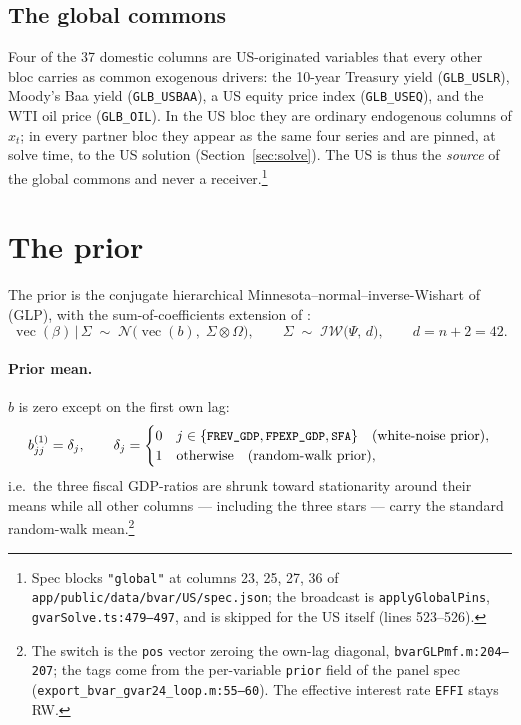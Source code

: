 \documentclass[11pt]{article}
\newcommand{\code}[1]{\texttt{\small #1}}
\begin{document}
\subsection{The global commons}\label{sec:globals}

Four of the 37 domestic columns are US-originated variables that every other bloc carries as
common exogenous drivers: the 10-year Treasury yield (\code{GLB\_USLR}), Moody's Baa yield
(\code{GLB\_USBAA}), a US equity price index (\code{GLB\_USEQ}), and the WTI oil price
(\code{GLB\_OIL}). In the US bloc they are ordinary endogenous columns of $x_t$; in every partner
bloc they appear as the same four series and are pinned, at solve time, to the US solution
(Section~\ref{sec:solve}). The US is thus the \emph{source} of the global commons and never a
receiver.\footnote{Spec blocks \code{"global"} at columns 23, 25, 27, 36 of
\code{app/public/data/bvar/US/spec.json}; the broadcast is \code{applyGlobalPins},
\code{gvarSolve.ts:479--497}, and is skipped for the US itself (lines 523--526).}

\section{The prior}\label{sec:prior}

The prior is the conjugate hierarchical Minnesota--normal--inverse-Wishart of
\citet{Giannone2015} (GLP), with the sum-of-coefficients extension of
\citet{DoanLittermanSims1984}:
\begin{equation}\label{eq:niw}
  \operatorname{vec}(\beta) \,\big|\, \Sigma \;\sim\;
  \mathcal{N}\!\big(\operatorname{vec}(b),\; \Sigma \otimes \Omega\big),
  \qquad
  \Sigma \;\sim\; \mathcal{IW}\!\big(\Psi,\, d\big), \qquad d = n+2 = 42 .
\end{equation}

\paragraph{Prior mean.} $b$ is zero except on the first own lag:
\begin{equation}\label{eq:priormean}
  b^{(1)}_{jj} = \delta_j, \qquad
  \delta_j =
  \begin{cases}
    0 & j \in \{\code{FREV\_GDP}, \code{FPEXP\_GDP}, \code{SFA}\} \quad (\text{white-noise prior}),\\
    1 & \text{otherwise} \quad (\text{random-walk prior}),
  \end{cases}
\end{equation}
i.e.\ the three fiscal GDP-ratios are shrunk toward stationarity around their means while all
other columns --- including the three stars --- carry the standard random-walk mean.\footnote{The
switch is the \code{pos} vector zeroing the own-lag diagonal, \code{bvarGLPmf.m:204--207}; the
tags come from the per-variable \code{prior} field of the panel spec
(\code{export\_bvar\_gvar24\_loop.m:55--60}). The effective interest rate \code{EFFI} stays RW.}
\end{document}
